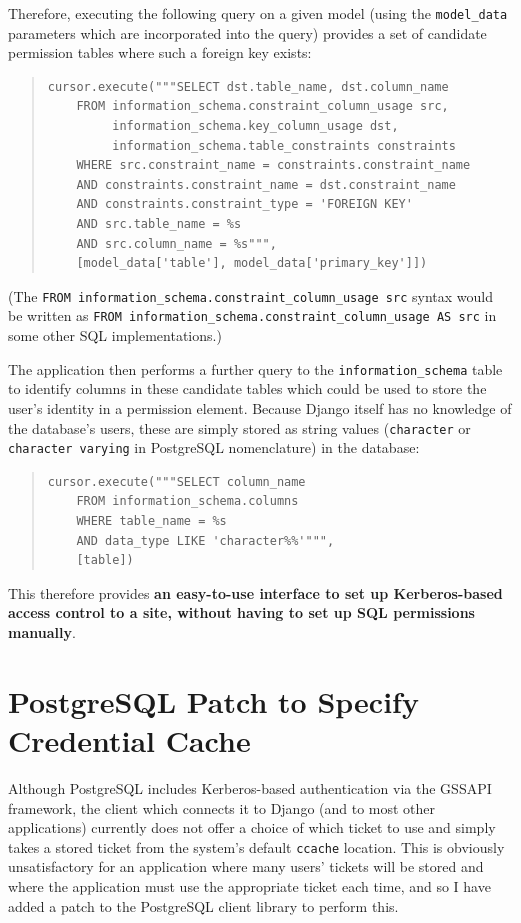 \documentclass[12pt]{report}
\begin{document}
Therefore, executing the following query on a given model (using the \verb+model_data+ parameters which are incorporated into the query) provides a set of candidate permission tables where such a foreign key exists:

\begin{quote}
\begin{samepage}
\begin{verbatim}
cursor.execute("""SELECT dst.table_name, dst.column_name
    FROM information_schema.constraint_column_usage src,
         information_schema.key_column_usage dst,
         information_schema.table_constraints constraints
    WHERE src.constraint_name = constraints.constraint_name
    AND constraints.constraint_name = dst.constraint_name
    AND constraints.constraint_type = 'FOREIGN KEY'
    AND src.table_name = %s
    AND src.column_name = %s""",
    [model_data['table'], model_data['primary_key']])
\end{verbatim}
\end{samepage}
\end{quote}

(The \verb+FROM information_schema.constraint_column_usage src+ syntax would be written as \verb+FROM information_schema.constraint_column_usage AS src+ in some other SQL implementations.)

The application then performs a further query to the \verb+information_schema+ table to identify columns in these candidate tables which could be used to store the user's identity in a permission element. Because Django itself has no knowledge of the database's users, these are simply stored as string values (\texttt{character} or \texttt{character varying} in PostgreSQL nomenclature) in the database:

\begin{quote}
\begin{samepage}
\begin{verbatim}
cursor.execute("""SELECT column_name
    FROM information_schema.columns
    WHERE table_name = %s
    AND data_type LIKE 'character%%'""",
    [table])
\end{verbatim}
\end{samepage}
\end{quote}

This therefore provides \textbf{an easy-to-use interface to set up Kerberos-based access control to a site, without having to set up SQL permissions manually}.

\section{PostgreSQL Patch to Specify Credential Cache}
\label{sec:postgresql_patch}
Although PostgreSQL includes Kerberos-based authentication via the GSSAPI framework\cite{postgres-GSSAPI}, the client which connects it to Django (and to most other applications) currently does not offer a choice of which ticket to use and simply takes a stored ticket from the system's default \texttt{ccache} location. This is obviously unsatisfactory for an application where many users' tickets will be stored and where the application must use the appropriate ticket each time, and so I have added a patch to the PostgreSQL client library to perform this.
\end{document}
